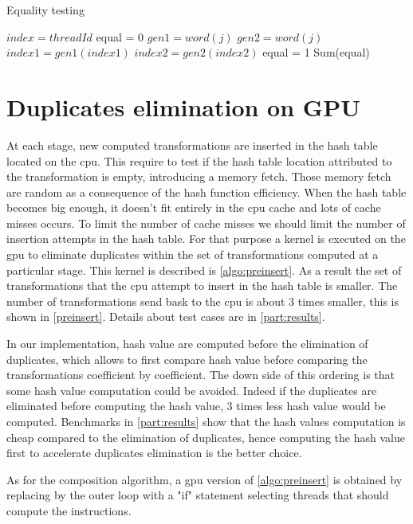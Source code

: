{\begin{algorithm}
\caption{Equality testing}
\label{algo:equal}
\begin{algorithmic}
\STATE $index = threadId$
\STATE equal = 0
\STATE $gen1 = word(j)$
\STATE $gen2 = word(j)$
\STATE $index1 = gen1(index1)$
\STATE $index2 = gen2(index2)$
\ENDFOR
{}
\STATE equal = 1
\ENDIF
\ENDIF
\STATE Sum(equal)
\end{algorithmic}
\end{algorithm}

\section{Duplicates elimination on GPU}
At each stage, new computed transformations are inserted in the hash table located on the \gls{cpu}. This require to test if the hash table location attributed to the transformation is empty, introducing a memory fetch. Those memory fetch are random as a consequence of the hash function efficiency. When the hash table becomes big enough, it doesn't fit entirely in the \gls{cpu} cache and lots of cache misses occurs.
To limit the number of cache misses we should limit the number of insertion attempts in the hash table. For that purpose a kernel is executed on the \gls{gpu} to eliminate duplicates within the set of transformations computed at a particular stage. This kernel is described is \autoref{algo:preinsert}. As a result the set of transformations that the \gls{cpu} attempt to insert in the hash table is smaller. The number of transformations send bask to the \gls{cpu} is about 3 times smaller, this is shown in \autoref{preinsert}. Details about test cases are in \autoref{part:results}.

In our implementation, hash value are computed before the elimination of duplicates, which allows to first compare hash value before comparing the transformations coefficient by coefficient. The down side of this ordering is that some hash value computation could be avoided. Indeed if the duplicates are eliminated before computing the hash value, 3 times less hash value would be computed. Benchmarks in \autoref{part:results} show that the hash values computation is cheap compared to the elimination of duplicates, hence computing the hash value first to accelerate duplicates elimination is the better choice.

As for the composition algorithm, a \gls{gpu} version of \autoref{algo:preinsert} is obtained by replacing by the outer loop with a "if" statement selecting threads that should compute the instructions.

}
